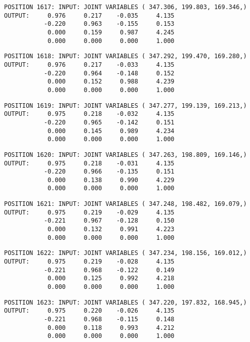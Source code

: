 \begin{verbatim}
POSITION 1617: INPUT: JOINT VARIABLES ( 347.306, 199.803, 169.346,)
OUTPUT:     0.976     0.217    -0.035     4.135
           -0.220     0.963    -0.155     0.153
            0.000     0.159     0.987     4.245
            0.000     0.000     0.000     1.000
\end{verbatim} \pagebreak[1]\begin{verbatim}
POSITION 1618: INPUT: JOINT VARIABLES ( 347.292, 199.470, 169.280,)
OUTPUT:     0.976     0.217    -0.033     4.135
           -0.220     0.964    -0.148     0.152
            0.000     0.152     0.988     4.239
            0.000     0.000     0.000     1.000
\end{verbatim} \pagebreak[1]\begin{verbatim}
POSITION 1619: INPUT: JOINT VARIABLES ( 347.277, 199.139, 169.213,)
OUTPUT:     0.975     0.218    -0.032     4.135
           -0.220     0.965    -0.142     0.151
            0.000     0.145     0.989     4.234
            0.000     0.000     0.000     1.000
\end{verbatim} \pagebreak[1]\begin{verbatim}
POSITION 1620: INPUT: JOINT VARIABLES ( 347.263, 198.809, 169.146,)
OUTPUT:     0.975     0.218    -0.031     4.135
           -0.220     0.966    -0.135     0.151
            0.000     0.138     0.990     4.229
            0.000     0.000     0.000     1.000
\end{verbatim} \pagebreak[1]\begin{verbatim}
POSITION 1621: INPUT: JOINT VARIABLES ( 347.248, 198.482, 169.079,)
OUTPUT:     0.975     0.219    -0.029     4.135
           -0.221     0.967    -0.128     0.150
            0.000     0.132     0.991     4.223
            0.000     0.000     0.000     1.000
\end{verbatim} \pagebreak[1]\begin{verbatim}
POSITION 1622: INPUT: JOINT VARIABLES ( 347.234, 198.156, 169.012,)
OUTPUT:     0.975     0.219    -0.028     4.135
           -0.221     0.968    -0.122     0.149
            0.000     0.125     0.992     4.218
            0.000     0.000     0.000     1.000
\end{verbatim} \pagebreak[1]\begin{verbatim}
POSITION 1623: INPUT: JOINT VARIABLES ( 347.220, 197.832, 168.945,)
OUTPUT:     0.975     0.220    -0.026     4.135
           -0.221     0.968    -0.115     0.148
            0.000     0.118     0.993     4.212
            0.000     0.000     0.000     1.000
\end{verbatim} \pagebreak[1]\begin{verbatim}

\end{verbatim}

